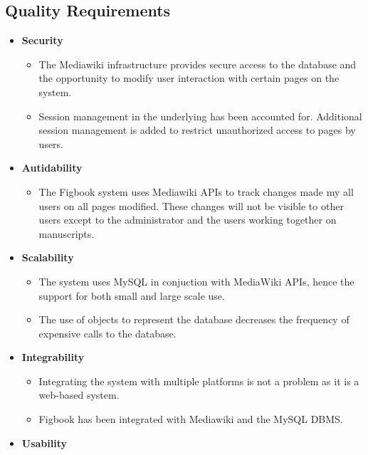 \renewcommand{\labelitemii}{$\star$}
%

\subsection{Quality Requirements}

\begin{itemize}
	\item \textbf{Security}
	\begin{itemize}
		\item The Mediawiki infrastructure provides secure access to the database and the opportunity to modify user interaction with certain pages on the system.
		\item Session management in the underlying has been accounted for. Additional session management is added to restrict unauthorized access to  pages by users.
	\end{itemize}
	\item \textbf{Autidability}
	\begin{itemize}
		\item The Figbook system uses Mediawiki APIs to track changes made my all users on all pages modified. These changes will not be visible to other users except to the administrator and the users working together on manuscripts.
	\end{itemize}
	\item \textbf{Scalability}
	\begin{itemize}
		\item The system uses MySQL in conjuction with MediaWiki APIs, hence the support for both small and large scale use.
		\item The use of objects to represent the database decreases the frequency of expensive calls to the database.
	\end{itemize}
	\item \textbf{Integrability}
	\begin{itemize}
		\item Integrating the system with multiple platforms is not a problem as it is a web-based system.
		\item Figbook has been integrated with Mediawiki and the MySQL DBMS.
	\end{itemize}
	\item \textbf{Usability}
	\begin{itemize}

\end{itemize}
\end{itemize}
